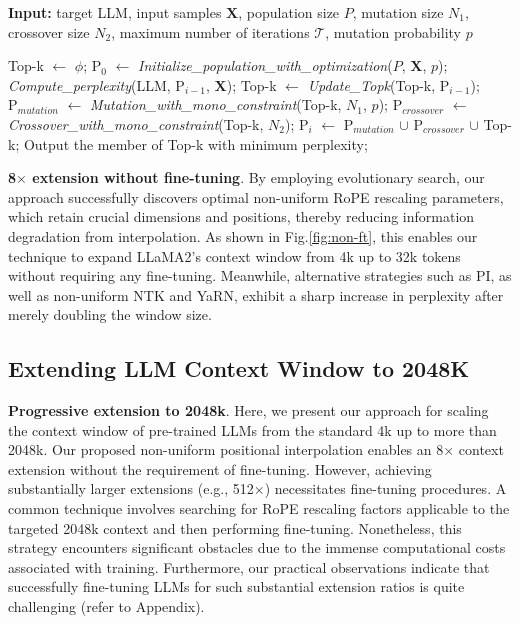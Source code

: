 \begin{algorithm}[t]
	\small
	\caption{The search algorithm}
	\textbf{Input:} target LLM, input samples $\mathbf{X}$, population size $P$, mutation size $N_1$, crossover size $N_2$, maximum number of iterations $\mathcal{T}$, mutation probability $p$\\

	\begin{algorithmic}[1]
		\label{alg:search}
		\STATE Top-k $\gets$ $\phi$;
		\STATE $\text{P}_0$ $\gets$ \textit{Initialize\_population\_with\_optimization}($P$, $\mathbf{X}$, $p$);
		\STATE \textit{Compute\_perplexity}(LLM, $\text{P}_{i-1}$, $\mathbf{X}$);
		\STATE Top-k $\gets$ \textit{Update\_Topk}(Top-k, $\text{P}_{i-1}$);
		\STATE $\text{P}_{mutation}$ $\gets$ \textit{Mutation\_with\_mono\_constraint}(Top-k, $N_1$, $p$);
		\STATE $\text{P}_{crossover}$ $\gets$ \textit{Crossover\_with\_mono\_constraint}(Top-k, $N_2$);
		\STATE $\text{P}_i$ $\gets$ $\text{P}_{mutation}$ $\cup$ $\text{P}_{crossover}$ $\cup$ Top-k;
		\ENDFOR
		\STATE Output the member of Top-k with minimum perplexity;
	\end{algorithmic}
\end{algorithm}

\textbf{8$\times$ extension without fine-tuning}. By employing evolutionary search, our approach successfully discovers optimal non-uniform RoPE rescaling parameters, which retain crucial dimensions and positions, thereby reducing information degradation from interpolation. As shown in Fig.\ref{fig:non-ft}, this enables our technique to expand LLaMA2’s context window from 4k up to 32k tokens without requiring any fine-tuning. Meanwhile, alternative strategies such as PI, as well as non-uniform NTK and YaRN, exhibit a sharp increase in perplexity after merely doubling the window size.

\subsection{Extending LLM Context Window to 2048K}
\label{sec:extendto2048k}

\textbf{Progressive extension to 2048k}. Here, we present our approach for scaling the context window of pre-trained LLMs from the standard 4k up to more than 2048k. Our proposed non-uniform positional interpolation enables an 8$\times$ context extension without the requirement of fine-tuning. However, achieving substantially larger extensions (e.g., 512$\times$) necessitates fine-tuning procedures. A common technique involves searching for RoPE rescaling factors applicable to the targeted 2048k context and then performing fine-tuning. Nonetheless, this strategy encounters significant obstacles due to the immense computational costs associated with training. Furthermore, our practical observations indicate that successfully fine-tuning LLMs for such substantial extension ratios is quite challenging (refer to Appendix).

